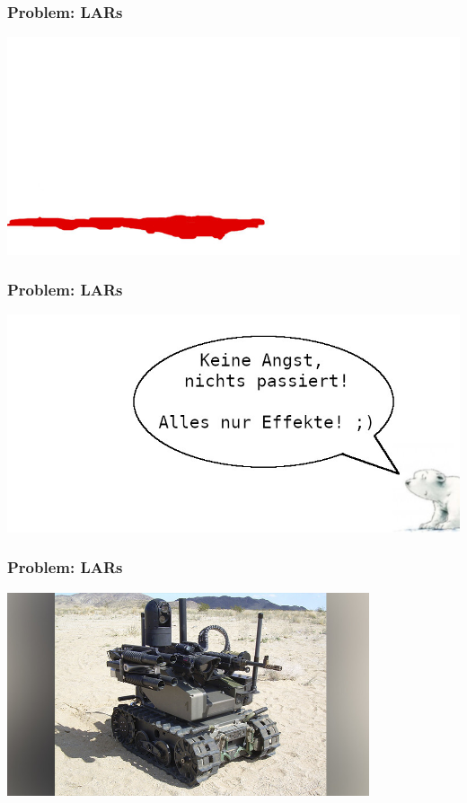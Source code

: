 \documentclass[aspectratio=169,x11names]{beamer}
\begin{document}
\begin{frame}
\frametitle{Problem: LARs}

\begin{center}
\includegraphics[width=1.067\textwidth]{images/lars6.jpg} 
\end{center}
\end{frame}


\begin{frame}
\frametitle{Problem: LARs}

\begin{center}
\includegraphics[width=1.067\textwidth]{images/lars7.jpg} 
\end{center}
\end{frame}


\begin{frame}
\frametitle{Problem: LARs}

\begin{center}
\includegraphics[width=0.8\textwidth]{images/lethal.jpg} 
\end{center}
\end{frame}
\end{document}
